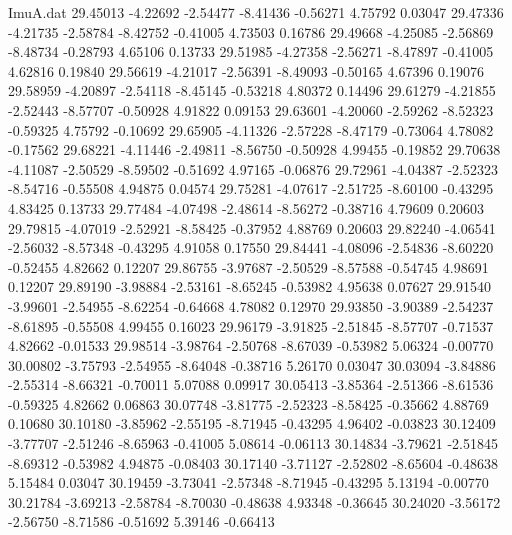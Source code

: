 \begin{filecontents}{ImuA.dat}
  29.45013   -4.22692   -2.54477   -8.41436   -0.56271    4.75792    0.03047
  29.47336   -4.21735   -2.58784   -8.42752   -0.41005    4.73503    0.16786
  29.49668   -4.25085   -2.56869   -8.48734   -0.28793    4.65106    0.13733
  29.51985   -4.27358   -2.56271   -8.47897   -0.41005    4.62816    0.19840
  29.56619   -4.21017   -2.56391   -8.49093   -0.50165    4.67396    0.19076
  29.58959   -4.20897   -2.54118   -8.45145   -0.53218    4.80372    0.14496
  29.61279   -4.21855   -2.52443   -8.57707   -0.50928    4.91822    0.09153
  29.63601   -4.20060   -2.59262   -8.52323   -0.59325    4.75792   -0.10692
  29.65905   -4.11326   -2.57228   -8.47179   -0.73064    4.78082   -0.17562
  29.68221   -4.11446   -2.49811   -8.56750   -0.50928    4.99455   -0.19852
  29.70638   -4.11087   -2.50529   -8.59502   -0.51692    4.97165   -0.06876
  29.72961   -4.04387   -2.52323   -8.54716   -0.55508    4.94875    0.04574
  29.75281   -4.07617   -2.51725   -8.60100   -0.43295    4.83425    0.13733
  29.77484   -4.07498   -2.48614   -8.56272   -0.38716    4.79609    0.20603
  29.79815   -4.07019   -2.52921   -8.58425   -0.37952    4.88769    0.20603
  29.82240   -4.06541   -2.56032   -8.57348   -0.43295    4.91058    0.17550
  29.84441   -4.08096   -2.54836   -8.60220   -0.52455    4.82662    0.12207
  29.86755   -3.97687   -2.50529   -8.57588   -0.54745    4.98691    0.12207
  29.89190   -3.98884   -2.53161   -8.65245   -0.53982    4.95638    0.07627
  29.91540   -3.99601   -2.54955   -8.62254   -0.64668    4.78082    0.12970
  29.93850   -3.90389   -2.54237   -8.61895   -0.55508    4.99455    0.16023
  29.96179   -3.91825   -2.51845   -8.57707   -0.71537    4.82662   -0.01533
  29.98514   -3.98764   -2.50768   -8.67039   -0.53982    5.06324   -0.00770
  30.00802   -3.75793   -2.54955   -8.64048   -0.38716    5.26170    0.03047
  30.03094   -3.84886   -2.55314   -8.66321   -0.70011    5.07088    0.09917
  30.05413   -3.85364   -2.51366   -8.61536   -0.59325    4.82662    0.06863
  30.07748   -3.81775   -2.52323   -8.58425   -0.35662    4.88769    0.10680
  30.10180   -3.85962   -2.55195   -8.71945   -0.43295    4.96402   -0.03823
  30.12409   -3.77707   -2.51246   -8.65963   -0.41005    5.08614   -0.06113
  30.14834   -3.79621   -2.51845   -8.69312   -0.53982    4.94875   -0.08403
  30.17140   -3.71127   -2.52802   -8.65604   -0.48638    5.15484    0.03047
  30.19459   -3.73041   -2.57348   -8.71945   -0.43295    5.13194   -0.00770
  30.21784   -3.69213   -2.58784   -8.70030   -0.48638    4.93348   -0.36645
  30.24020   -3.56172   -2.56750   -8.71586   -0.51692    5.39146   -0.66413

\end{filecontents}
